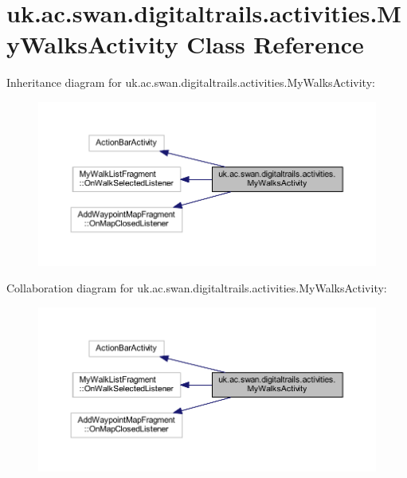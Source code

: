 \hypertarget{classuk_1_1ac_1_1swan_1_1digitaltrails_1_1activities_1_1_my_walks_activity}{\section{uk.\+ac.\+swan.\+digitaltrails.\+activities.\+My\+Walks\+Activity Class Reference}
\label{classuk_1_1ac_1_1swan_1_1digitaltrails_1_1activities_1_1_my_walks_activity}
}


Inheritance diagram for uk.\+ac.\+swan.\+digitaltrails.\+activities.\+My\+Walks\+Activity\+:\nopagebreak
\begin{figure}[H]
\begin{center}
\leavevmode
\includegraphics[width=350pt]{classuk_1_1ac_1_1swan_1_1digitaltrails_1_1activities_1_1_my_walks_activity__inherit__graph}
\end{center}
\end{figure}


Collaboration diagram for uk.\+ac.\+swan.\+digitaltrails.\+activities.\+My\+Walks\+Activity\+:\nopagebreak
\begin{figure}[H]
\begin{center}
\leavevmode
\includegraphics[width=350pt]{classuk_1_1ac_1_1swan_1_1digitaltrails_1_1activities_1_1_my_walks_activity__coll__graph}
\end{center}
\end{figure}
